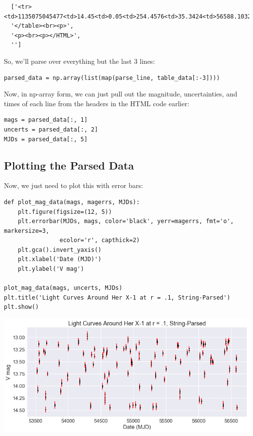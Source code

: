 \documentclass[11pt]{article}
\begin{document}
\begin{verbatim}
  ['<tr><td>1135075045477<td>14.45<td>0.05<td>254.4576<td>35.3424<td>56588.10323</tr>',
  '</table><br><p>',
  '<p><br><p></HTML>',
  '']
\end{verbatim}

So, we'll parse over everything but the last 3 lines:

\begin{verbatim}
parsed_data = np.array(list(map(parse_line, table_data[:-3])))
\end{verbatim}


Now, in np-array form, we can just pull out the magnitude, uncertainties, and
times of each line from the headers in the HTML code earlier:

\begin{verbatim}
mags = parsed_data[:, 1]
uncerts = parsed_data[:, 2]
MJDs = parsed_data[:, 5]
\end{verbatim}

\subsection*{Plotting the Parsed Data}
\label{sec-4-1}

Now, we just need to plot this with error bars:

\begin{verbatim}
def plot_mag_data(mags, magerrs, MJDs):
    plt.figure(figsize=(12, 5))
    plt.errorbar(MJDs, mags, color='black', yerr=magerrs, fmt='o', markersize=3,
                ecolor='r', capthick=2)
    plt.gca().invert_yaxis()
    plt.xlabel('Date (MJD)')
    plt.ylabel('V mag')

plot_mag_data(mags, uncerts, MJDs)
plt.title('Light Curves Around Her X-1 at r = .1, String-Parsed')
plt.show()
\end{verbatim}

\includegraphics[width=.9\linewidth]{./obipy-resources/17087juc.png}
\end{document}
